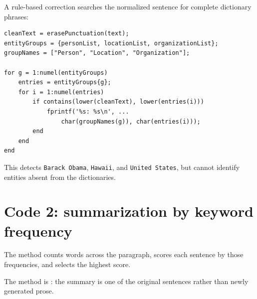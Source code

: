 A rule-based correction searches the normalized sentence for complete dictionary phrases:

\begin{lstlisting}[style=mlmatlab]
cleanText = erasePunctuation(text);
entityGroups = {personList, locationList, organizationList};
groupNames = ["Person", "Location", "Organization"];

for g = 1:numel(entityGroups)
    entries = entityGroups{g};
    for i = 1:numel(entries)
        if contains(lower(cleanText), lower(entries(i)))
            fprintf('%s: %s\n', ...
                char(groupNames(g)), char(entries(i)));
        end
    end
end
\end{lstlisting}

This detects \texttt{Barack Obama}, \texttt{Hawaii}, and \texttt{United States}, but cannot identify entities absent from the dictionaries.

\section{Code 2: summarization by keyword frequency}

The method counts words across the paragraph, scores each sentence by those frequencies, and selects the highest score.

\begin{mlfigure}
\end{mlfigure}

The method is : the summary is one of the original sentences rather than newly generated prose.

